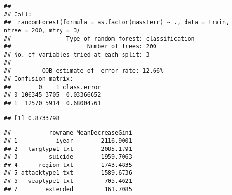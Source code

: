 \documentclass[11pt,letterpaper,]{article}
\newenvironment{Shaded}{\begin{snugshade}}{\end{snugshade}}
\newcommand{\KeywordTok}[1]{\textcolor[rgb]{0.13,0.29,0.53}{\textbf{{#1}}}}
\newcommand{\StringTok}[1]{\textcolor[rgb]{0.31,0.60,0.02}{{#1}}}
\newcommand{\NormalTok}[1]{{#1}}
\theoremstyle{definition}
\theoremstyle{definition}
\theoremstyle{definition}
\theoremstyle{remark}
\begin{document}
\begin{verbatim}
## 
## Call:
##  randomForest(formula = as.factor(massTerr) ~ ., data = train,      ntree = 200, mtry = 3) 
##                Type of random forest: classification
##                      Number of trees: 200
## No. of variables tried at each split: 3
## 
##         OOB estimate of  error rate: 12.66%
## Confusion matrix:
##        0    1 class.error
## 0 106345 3705  0.03366652
## 1  12570 5914  0.68004761
\end{verbatim}

\begin{Shaded}
\end{Shaded}

\begin{verbatim}
## [1] 0.8733798
\end{verbatim}

\begin{Shaded}
\end{Shaded}

\begin{verbatim}
##           rowname MeanDecreaseGini
## 1           iyear        2116.9001
## 2   targtype1_txt        2085.1791
## 3         suicide        1959.7063
## 4      region_txt        1743.4835
## 5 attacktype1_txt        1589.6736
## 6   weaptype1_txt         705.4621
## 7        extended         161.7085
\end{verbatim}
\end{document}
